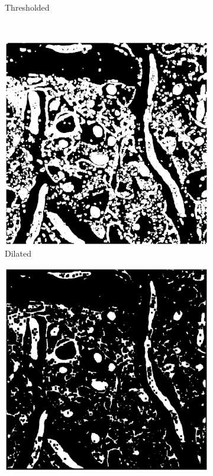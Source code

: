 \documentclass[a4paper, 11pt]{article}
\numberwithin{equation}{section}
\begin{document}
\begin{figure}[!ht]
\begin{subfigure}[t]{.3\textwidth}
				\caption{Thresholded}
			\end{subfigure}
			\\
			\begin{subfigure}[t]{.3\textwidth}
				\centering
				\includegraphics[width=\textwidth]{11_dilate}
				\caption{Dilated}
			\end{subfigure}
			\quad
			\begin{subfigure}[t]{.3\textwidth}
				\centering
				\includegraphics[width=\textwidth]{12_erode}

\end{subfigure}
\end{figure}
\end{document}
